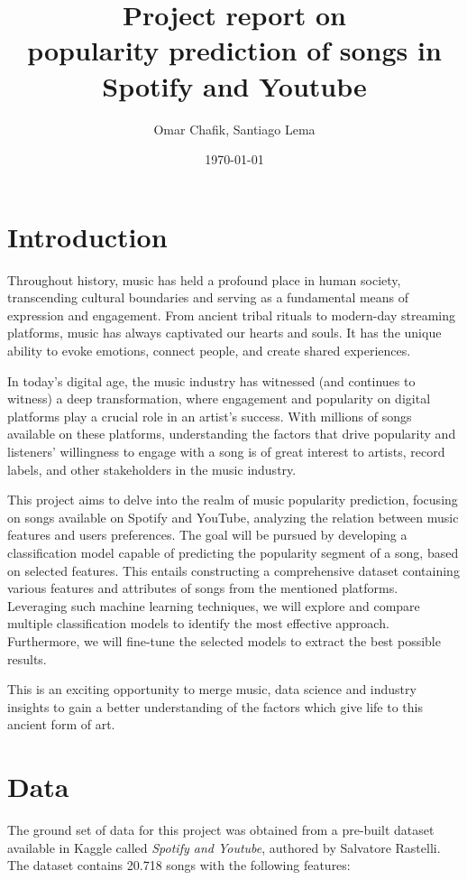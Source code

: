 \documentclass[11pt]{article} %
\title{Project report on\\
popularity prediction of songs in Spotify and Youtube \\
}
\author{Omar Chafik, Santiago Lema}
\date{\today}
\begin{document}
\maketitle

\section{Introduction}

Throughout history, music has held a profound place in human society, transcending cultural boundaries and serving as a fundamental means of expression and engagement. From ancient tribal rituals to modern-day streaming platforms, music has always captivated our hearts and souls. It has the unique ability to evoke emotions, connect people, and create shared experiences. 

In today's digital age, the music industry has witnessed (and continues to witness) a deep transformation, where engagement and popularity on digital platforms play a crucial role in an artist's success. With millions of songs available on these platforms, understanding the factors that drive popularity and listeners' willingness to engage with a song is of great interest to artists, record labels, and other stakeholders in the music industry.

This project aims to delve into the realm of music popularity prediction, focusing on songs available on Spotify and YouTube, analyzing the relation between music features and users preferences. The goal will be pursued by developing  a classification model capable of predicting the popularity segment of a song, based on selected features. This entails constructing a comprehensive dataset containing various features and attributes of songs from the mentioned platforms. Leveraging such machine learning techniques, we will explore and compare multiple classification models to identify the most effective approach. Furthermore, we will fine-tune the selected models to extract the best possible results.

This is an exciting opportunity to merge music, data science and industry insights to gain a better understanding of the factors which give life to this ancient form of art. 

\section{Data}

The ground set of data for this project was obtained from a pre-built dataset available in Kaggle called \textit{Spotify and Youtube}, authored by Salvatore Rastelli\cite{Rasetri}. The dataset contains 20.718 songs with the following features:
\end{document}
